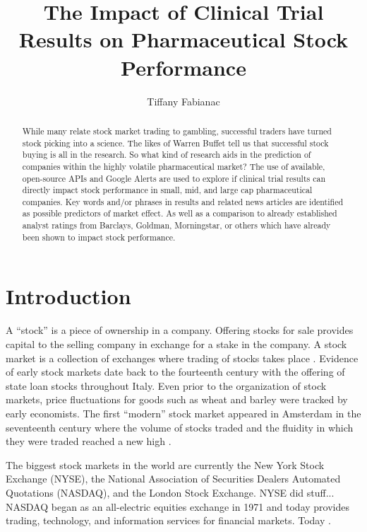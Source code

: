 \documentclass[sigconf]{acmart}
\begin{document}
\title{The Impact of Clinical Trial Results on Pharmaceutical Stock Performance}

\author{Tiffany Fabianac} 
 \renewcommand{\shortauthors}{T. Fabianac} 

\begin{abstract}
While many relate stock market trading to gambling, successful traders have turned stock picking into a science. The likes of Warren Buffet tell us that successful stock buying is all in the research. So what kind of research aids in the prediction of companies within the highly volatile pharmaceutical market? The use of available, open-source APIs and Google Alerts are used to explore if clinical trial results can directly impact stock performance in small, mid, and large cap pharmaceutical companies. Key words and/or phrases in results and related news articles are identified as possible predictors of market effect. As well as a comparison to already established analyst ratings from Barclays, Goldman, Morningstar, or others which have already been shown to impact stock performance.
\end{abstract}

\maketitle
\section{Introduction}
A ``stock'' is a piece of ownership in a company. Offering stocks for sale provides capital to the selling company in exchange for a stake in the company. A stock market is a collection of exchanges where trading of stocks takes place \cite{www-investopedia}. Evidence of early stock markets date back to the fourteenth century with the offering of state loan stocks throughout Italy. Even prior to the organization of stock markets, price fluctuations for goods such as wheat and barley were tracked by early economists. The first ``modern'' stock market appeared in Amsterdam in the seventeenth century where the volume of stocks traded and the fluidity in which they were traded reached a new high \cite{Braudel}. 

The biggest stock markets in the world are currently the New York Stock Exchange (NYSE), the National Association of Securities Dealers Automated Quotations (NASDAQ), and the London Stock Exchange. NYSE did stuff... NASDAQ began as an all-electric equities exchange in 1971 and today provides trading, technology, and information services for financial markets. Today   \cite{www-nasdaq}.
\end{document}
